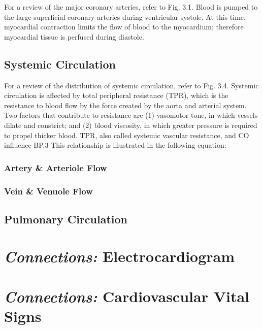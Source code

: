 For a review of the major coronary arteries, refer to Fig. 3.1. Blood is pumped to the large superficial coronary arteries during ventricular systole. At this time, myocardial contraction limits the flow of blood to the myocardium; therefore myocardial tissue is perfused during diastole.

\subsection{Systemic Circulation}
For a review of the distribution of systemic circulation, refer to Fig. 3.4. Systemic circulation is affected by total peripheral resistance (TPR), which is the resistance to blood flow by the force created by the aorta and arterial system. Two factors that contribute to resistance are (1) vasomotor tone, in which vessels dilate and constrict; and (2) blood viscosity, in which greater pressure is required to propel thicker blood. TPR, also called systemic vascular resistance, and CO influence BP.3 This relationship is illustrated in the following equation:
\subsubsection{Artery \& Arteriole Flow}

\subsubsection{Vein \&  Venuole Flow}

\subsection{Pulmonary Circulation}





\section{\textit{Connections:} Electrocardiogram}

\section{\textit{Connections:} Cardiovascular Vital Signs}
